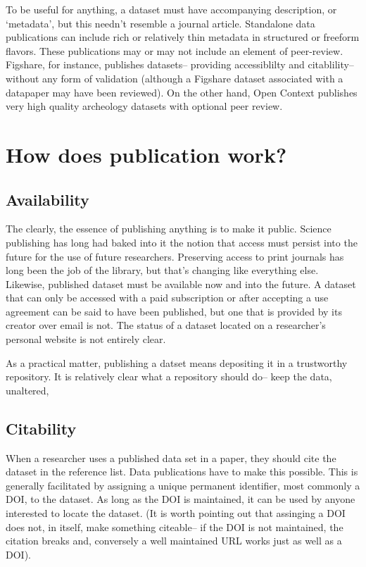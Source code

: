 \documentclass{article}
\begin{document}
To be useful for anything, a dataset must have accompanying description, or `metadata', but this needn't resemble a journal article. Standalone data publications can include rich or relatively thin metadata in structured or freeform flavors.
These publications may or may not include an element of peer-review.
Figshare, for instance, publishes datasets-- providing accessiblilty and citablility-- without any form of validation (although a Figshare dataset associated with a datapaper may have been reviewed).
On the other hand, Open Context publishes very high quality archeology datasets with optional peer review.

\section{How does publication work?}\label{how-does-publication-work}

\subsection{Availability}\label{availability}

The clearly, the essence of publishing anything is to make it public.
Science publishing has long had baked into it the notion that access must persist into the future for the use of future researchers.
Preserving access to print journals has long been the job of the library, but that's changing like everything else.
Likewise, published dataset must be available now and into the future.
A dataset that can only be accessed with a paid subscription or after accepting a use agreement can be said to have been published, but one that is provided by its creator over email is not.
The status of a dataset located on a researcher's personal website is not entirely clear.

As a practical matter, publishing a datset means depositing it in a trustworthy repository.
It is relatively clear what a repository should do-- keep the data, unaltered,

\subsection{Citability}\label{citability}

When a researcher uses a published data set in a paper, they should cite the dataset in the reference list.
Data publications have to make this possible.
This is generally facilitated by assigning a unique permanent identifier, most commonly a DOI, to the dataset.
As long as the DOI is maintained, it can be used by anyone interested to locate the dataset. (It is worth pointing out that assinging a DOI does not, in itself, make something citeable-- if the DOI is not maintained, the citation breaks and, conversely a well maintained URL works just as well as a DOI).
\end{document}
